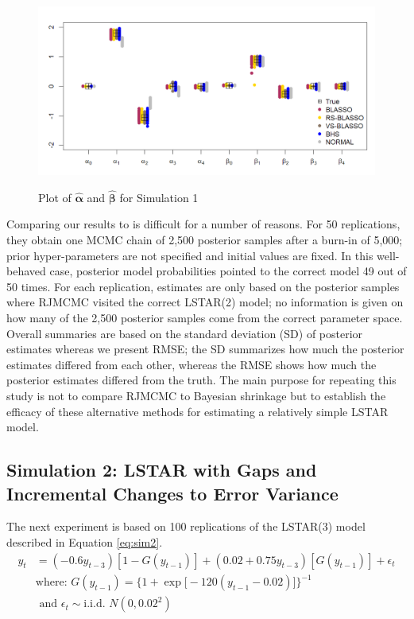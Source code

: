 \begin{figure}[!h]
	\centering
	      \caption{Plot of $\hat{\bm{\alpha}}$ and $\hat{\bm{\beta}}$ for Simulation 1 }
      \includegraphics[scale=0.35]{blassovsbhs}
      \label{fig:blvsbh}
\end{figure}

Comparing our results to \cite{Lopes2006} is difficult for a number of reasons. For 50 replications, they obtain one MCMC chain of 2,500 posterior samples after a burn-in of 5,000; prior hyper-parameters are not specified and initial values are fixed. In this well-behaved case, posterior model probabilities pointed to the correct model 49 out of 50 times. For each replication, estimates are only based on the posterior samples where RJMCMC visited the correct LSTAR(2) model; no information is given on how many of the 2,500 posterior samples come from the correct parameter space. Overall summaries are based on the standard deviation (SD) of posterior estimates whereas we present RMSE; the SD summarizes how much the posterior estimates differed from each other, whereas the RMSE shows how much the posterior estimates differed from the truth. The main purpose for repeating this study is not to compare RJMCMC to Bayesian shrinkage but to establish the efficacy of these alternative methods for estimating a relatively simple LSTAR model. 

\subsection{Simulation 2: LSTAR with Gaps and Incremental Changes to Error Variance}
The next experiment is based on 100 replications of the LSTAR(3) model described in Equation \ref{eq:sim2}.
 \begin{equation}
	\begin{split}
		\label{eq:sim2}
		y_t&=(-0.6y_{t-3})[1-G(y_{t-1})] +(0.02+0.75y_{t-3})[G(y_{t-1})]+\epsilon_t\\
		& \textrm{where: } G(y_{t-1})=\bigg\{1+\exp\big[-120(y_{t-1}-0.02)\big]\bigg\}^{-1} \\
		&\textrm{ and }\epsilon_t \sim \textrm{i.i.d. }  N (0,0.02^2)\\
	\end{split}
\end{equation}

